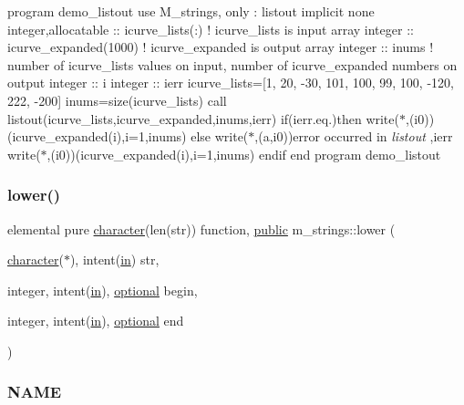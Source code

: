 program demo\+\_\+listout use M\+\_\+strings, only \+: listout implicit none integer,allocatable \+:\+: icurve\+\_\+lists(\+:) ! icurve\+\_\+lists is input array integer \+:\+: icurve\+\_\+expanded(1000) ! icurve\+\_\+expanded is output array integer \+:\+: inums ! number of icurve\+\_\+lists values on input, number of icurve\+\_\+expanded numbers on output integer \+:\+: i integer \+:\+: ierr icurve\+\_\+lists=\mbox{[}1, 20, -\/30, 101, 100, 99, 100, -\/120, 222, -\/200\mbox{]} inums=size(icurve\+\_\+lists) call listout(icurve\+\_\+lists,icurve\+\_\+expanded,inums,ierr) if(ierr.\+eq.)then write($\ast$,\textquotesingle{}(i0)\textquotesingle{})(icurve\+\_\+expanded(i),i=1,inums) else write($\ast$,\textquotesingle{}(a,i0)\textquotesingle{})\textquotesingle{}error occurred in {\itshape listout} \textquotesingle{},ierr write($\ast$,\textquotesingle{}(i0)\textquotesingle{})(icurve\+\_\+expanded(i),i=1,inums) endif end program demo\+\_\+listout \mbox{\label{namespacem__strings_a3c7d4be9051206e4b2f72112f9fdc3b4}} 
\subsubsection{\texorpdfstring{lower()}{lower()}}
{\footnotesize\ttfamily elemental pure \hyperlink{option__stopwatch_83_8txt_abd4b21fbbd175834027b5224bfe97e66}{character}(len(str)) function, \hyperlink{M__stopwatch_83_8txt_a2f74811300c361e53b430611a7d1769f}{public} m\+\_\+strings\+::lower (\begin{DoxyParamCaption}\item[{\hyperlink{option__stopwatch_83_8txt_abd4b21fbbd175834027b5224bfe97e66}{character}($\ast$), intent(\hyperlink{M__journal_83_8txt_afce72651d1eed785a2132bee863b2f38}{in})}]{str,  }\item[{integer, intent(\hyperlink{M__journal_83_8txt_afce72651d1eed785a2132bee863b2f38}{in}), \hyperlink{option__stopwatch_83_8txt_aa4ece75e7acf58a4843f70fe18c3ade5}{optional}}]{begin,  }\item[{integer, intent(\hyperlink{M__journal_83_8txt_afce72651d1eed785a2132bee863b2f38}{in}), \hyperlink{option__stopwatch_83_8txt_aa4ece75e7acf58a4843f70fe18c3ade5}{optional}}]{end }\end{DoxyParamCaption})}



\subsubsection*{N\+A\+ME}

